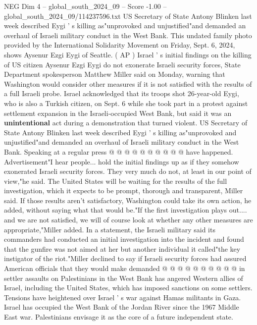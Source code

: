 \begin{textsample}{NEG Dim 4 – global\_south\_2024\_09 – Score -1.00 – global\_south\_2024\_09/114237596.txt}  \label{ex:f4_neg_163}
US Secretary of State Antony Blinken last week described Eygi ' s killing as"unprovoked and unjustified"and demanded an overhaul of Israeli military conduct in the West Bank.
This undated family photo provided by the International Solidarity Movement on Friday, Sept. 6, 2024, shows Aysenur Ezgi Eygi of Seattle. ( AP ) Israel ' s initial findings on the killing of US citizen Aysenur Ezgi Eygi do not exonerate Israeli security forces, State Department spokesperson Matthew Miller said on Monday, warning that Washington would consider other measures if it is not satisfied with the results of a full Israeli probe.
Israel acknowledged that its troops shot 26-year-old Eygi, who is also a Turkish citizen, on Sept. 6 while she took part in a protest against settlement expansion in the Israeli-occupied West Bank, but said it was an \textbf{unintentional} act during a demonstration that turned violent.
US Secretary of State Antony Blinken last week described Eygi ' s killing as"unprovoked and unjustified"and demanded an overhaul of Israeli military conduct in the West Bank.
Speaking at a regular press @ @ @ @ @ @ @ @ @ @ have happened.
Advertisement"I hear people... hold the initial findings up as if they somehow exonerated Israeli security forces.
They very much do not, at least in our point of view,"he said.
The United States will be waiting for the results of the full investigation, which it expects to be prompt, thorough and transparent, Miller said.
If those results aren't satisfactory, Washington could take its own action, he added, without saying what that would be."If the first investigation plays out.... and we are not satisfied, we will of course look at whether any other measures are appropriate,"Miller added.
In a statement, the Israeli military said its commanders had conducted an initial investigation into the incident and found that the gunfire was not aimed at her but another individual it called"the key instigator of the riot."Miller declined to say if Israeli security forces had assured American officials that they would make demanded @ @ @ @ @ @ @ @ @ @ in settler assaults on Palestinians in the West Bank has angered Western allies of Israel, including the United States, which has imposed sanctions on some settlers.
Tensions have heightened over Israel ' s war against Hamas militants in Gaza.
Israel has occupied the West Bank of the Jordan River since the 1967 Middle East war.
Palestinians envisage it as the core of a future independent state.

\end{textsample}
